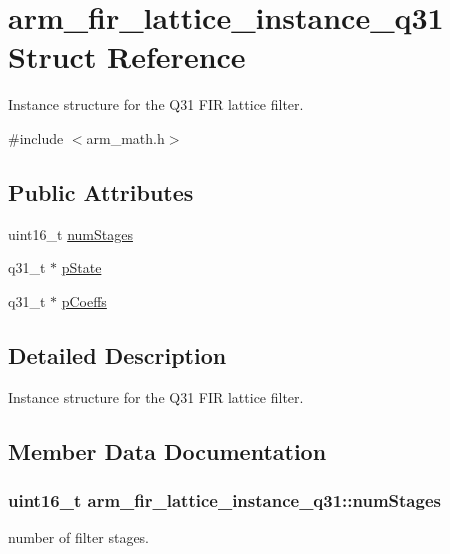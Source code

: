 \hypertarget{structarm__fir__lattice__instance__q31}{}\section{arm\+\_\+fir\+\_\+lattice\+\_\+instance\+\_\+q31 Struct Reference}
\label{structarm__fir__lattice__instance__q31}


Instance structure for the Q31 F\+IR lattice filter.  




{\ttfamily \#include $<$arm\+\_\+math.\+h$>$}

\subsection*{Public Attributes}
\begin{DoxyCompactItemize}
\item 
uint16\+\_\+t \hyperlink{structarm__fir__lattice__instance__q31_a9f3773bbb76bc5a8a5ee9d37786bf478}{num\+Stages}
\item 
q31\+\_\+t $\ast$ \hyperlink{structarm__fir__lattice__instance__q31_a08fe9494ab7cd336b791e9657adadcf6}{p\+State}
\item 
q31\+\_\+t $\ast$ \hyperlink{structarm__fir__lattice__instance__q31_a66c3364bf5863cd45e05f1652c3dc522}{p\+Coeffs}
\end{DoxyCompactItemize}


\subsection{Detailed Description}
Instance structure for the Q31 F\+IR lattice filter. 

\subsection{Member Data Documentation}
\subsubsection[{\texorpdfstring{num\+Stages}{numStages}}]{\setlength{\rightskip}{0pt plus 5cm}uint16\+\_\+t arm\+\_\+fir\+\_\+lattice\+\_\+instance\+\_\+q31\+::num\+Stages}\hypertarget{structarm__fir__lattice__instance__q31_a9f3773bbb76bc5a8a5ee9d37786bf478}{}\label{structarm__fir__lattice__instance__q31_a9f3773bbb76bc5a8a5ee9d37786bf478}
number of filter stages. 
